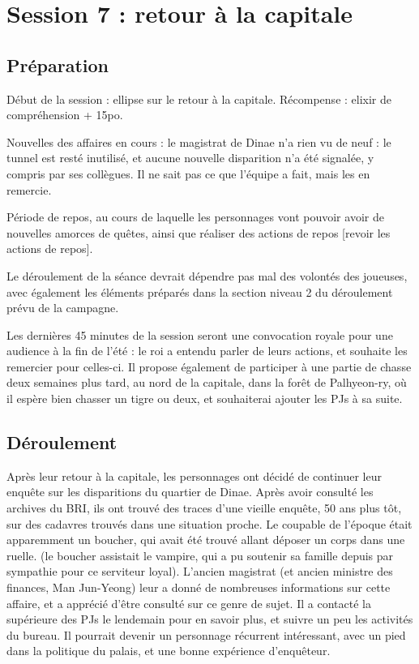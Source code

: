 \documentclass[10pt,a4paper]{book}
\begin{document}
\section{Session 7 : retour à la capitale}
\subsection{Préparation}
Début de la session : ellipse sur le retour à la capitale. Récompense : elixir de compréhension + 15po.

Nouvelles des affaires en cours : le magistrat de Dinae n'a rien vu de neuf : le tunnel est resté inutilisé, et aucune nouvelle disparition n'a été signalée, y compris par ses collègues. Il ne sait pas ce que l'équipe a fait, mais les en remercie.

Période de repos, au cours de laquelle les personnages vont pouvoir avoir de nouvelles amorces de quêtes, ainsi que réaliser des actions de repos [revoir les actions de repos].

Le déroulement de la séance devrait dépendre pas mal des volontés des joueuses, avec également les éléments préparés dans la section niveau 2 du déroulement prévu de la campagne.

Les dernières 45 minutes de la session seront une convocation royale pour une audience à la fin de l'été : le roi a entendu parler de leurs actions, et souhaite les remercier pour celles-ci. Il propose également de participer à une partie de chasse deux semaines plus tard, au nord de la capitale, dans la forêt de Palhyeon-ry, où il espère bien chasser un tigre ou deux, et souhaiterai ajouter les PJs à sa suite.
\subsection{Déroulement}
Après leur retour à la capitale, les personnages ont décidé de continuer leur enquête sur les disparitions du quartier de Dinae. Après avoir consulté les archives du BRI, ils ont trouvé des traces d'une vieille enquête, 50 ans plus tôt, sur des cadavres trouvés dans une situation proche. Le coupable de l'époque était apparemment un boucher, qui avait été trouvé allant déposer un corps dans une ruelle. (le boucher assistait le vampire, qui a pu soutenir sa famille depuis par sympathie pour ce serviteur loyal). L'ancien magistrat (et ancien ministre des finances, Man Jun-Yeong) leur a donné de nombreuses informations sur cette affaire, et a apprécié d'être consulté sur ce genre de sujet. Il a contacté la supérieure des PJs le lendemain pour en savoir plus, et suivre un peu les activités du bureau. Il pourrait devenir un personnage récurrent intéressant, avec un pied dans la politique du palais, et une bonne expérience d'enquêteur.
\end{document}
